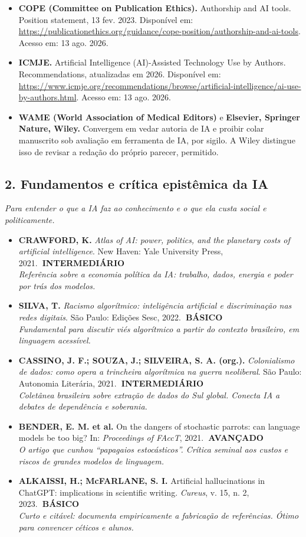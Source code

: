 \documentclass[11pt,a4paper]{article}
\newcommand{\iconBookmark}[1]{%
  \begin{tikzpicture}[baseline=-0.55ex]
    \draw[#1,line width=1pt,line join=round] (-0.11,0.15) -- (0.11,0.15) -- (0.11,-0.15) -- (0,-0.03) -- (-0.11,-0.15) -- cycle;
  \end{tikzpicture}}
\newcommand{\refc}[2]{\item #1\\{\footnotesize\color{cinzaescuro}\textit{#2}}}
\newcommand{\nivelbasico}{\hfill\colorbox{verdeCodigo}{\color{white}\scriptsize\poppinsmed\textbf{~BÁSICO~}}}
\newcommand{\nivelinterm}{\hfill\colorbox{amareloSol}{\color{black}\scriptsize\poppinsmed\textbf{~INTERMEDIÁRIO~}}}
\newcommand{\nivelavancado}{\hfill\colorbox{laranjaDestaque}{\color{white}\scriptsize\poppinsmed\textbf{~AVANÇADO~}}}
\begin{document}
\begin{leitura}[title={\iconBookmark{white}\ \ Normas editoriais internacionais e revisão por pares}]
\begin{itemize}[leftmargin=1.2em,nosep,label={}]
\item \textbf{COPE (Committee on Publication Ethics).} Authorship and AI tools. Position statement, 13 fev. 2023. Disponível em: \url{https://publicationethics.org/guidance/cope-position/authorship-and-ai-tools}. Acesso em: 13 ago. 2026.
\item \textbf{ICMJE.} Artificial Intelligence (AI)-Assisted Technology Use by Authors. Recommendations, atualizadas em 2026. Disponível em: \url{https://www.icmje.org/recommendations/browse/artificial-intelligence/ai-use-by-authors.html}. Acesso em: 13 ago. 2026.
\item \textbf{WAME (World Association of Medical Editors)} e \textbf{Elsevier, Springer Nature, Wiley.} Convergem em vedar autoria de IA e proibir colar manuscrito sob avaliação em ferramenta de IA, por sigilo. A Wiley distingue isso de revisar a redação do próprio parecer, permitido.
\end{itemize}
\end{leitura}

\subsection*{2. Fundamentos e crítica epistêmica da IA}
\textit{Para entender o que a IA faz ao conhecimento e o que ela custa social e politicamente.}
\begin{itemize}[leftmargin=1.4em,label={}]
\refc{\textbf{CRAWFORD, K.} \textit{Atlas of AI: power, politics, and the planetary costs of artificial intelligence}. New Haven: Yale University Press, 2021.\nivelinterm}{Referência sobre a economia política da IA: trabalho, dados, energia e poder por trás dos modelos.}
\refc{\textbf{SILVA, T.} \textit{Racismo algorítmico: inteligência artificial e discriminação nas redes digitais}. São Paulo: Edições Sesc, 2022.\nivelbasico}{Fundamental para discutir viés algorítmico a partir do contexto brasileiro, em linguagem acessível.}
\refc{\textbf{CASSINO, J. F.; SOUZA, J.; SILVEIRA, S. A. (org.).} \textit{Colonialismo de dados: como opera a trincheira algorítmica na guerra neoliberal}. São Paulo: Autonomia Literária, 2021.\nivelinterm}{Coletânea brasileira sobre extração de dados do Sul global. Conecta IA a debates de dependência e soberania.}
\refc{\textbf{BENDER, E. M. et al.} On the dangers of stochastic parrots: can language models be too big? In: \textit{Proceedings of FAccT}, 2021.\nivelavancado}{O artigo que cunhou ``papagaios estocásticos''. Crítica seminal aos custos e riscos de grandes modelos de linguagem.}
\refc{\textbf{ALKAISSI, H.; McFARLANE, S. I.} Artificial hallucinations in ChatGPT: implications in scientific writing. \textit{Cureus}, v. 15, n. 2, 2023.\nivelbasico}{Curto e citável: documenta empiricamente a fabricação de referências. Ótimo para convencer céticos e alunos.}
\end{itemize}
\end{document}
